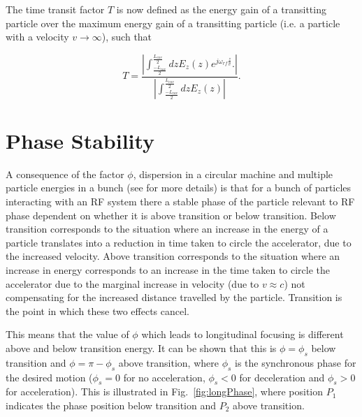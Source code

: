 The time transit factor $T$ is now defined as the energy gain of a transitting particle over the maximum energy gain of a transitting particle (i.e. a particle with a velocity $v \rightarrow \infty $), such that 

\begin{equation}
T =    \frac{\left| \int^{\frac{L_{cav}}{2}}_{\frac{-L_{cav}}{2}} dz E_{z}\left( z \right) e^{j \omega_{rf} \frac{z}{v}}.\right|}{  \left| \int^{\frac{L_{cav}}{2}}_{\frac{-L_{cav}}{2}} dz E_{z}\left( z \right) \right|}.
\end{equation}

\section{Phase Stability}

A consequence of the factor $\phi$, dispersion in a circular machine and multiple particle energies in a bunch (see \cite{Leduff:LongDyn} for more details) is that for a bunch of particles interacting with an RF system there a stable phase of the particle relevant to RF phase dependent on whether it is above transition or below transition. Below transition corresponds to the situation where an increase in the energy of a particle translates into a reduction in time taken to circle the accelerator, due to the increased velocity. Above transition corresponds to the situation where an increase in energy corresponds to an increase in the time taken to circle the accelerator due to the marginal increase in velocity (due to $v \approx c$) not compensating for the increased distance travelled by the particle. Transition is the point in which these two effects cancel.

This means that the value of $\phi$ which leads to longitudinal focusing is different above and below transition energy. It can be shown that this is $\phi = \phi_{s}$ below transition and $\phi = \pi - \phi_{s}$ above transition, where $\phi_{s}$ is the synchronous phase for the desired motion ($\phi_{s} = 0$ for no acceleration, $\phi_{s} < 0$ for deceleration and $\phi_{s} > 0$ for acceleration). This is illustrated in Fig.~\ref{fig:longPhase}, where position $P_{1}$ indicates the phase position below transition and $P_{2}$ above transition.

